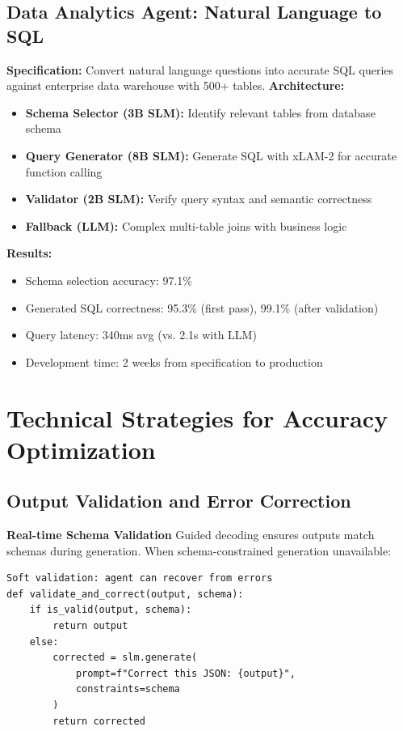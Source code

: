 \documentclass[11pt,a4paper]{article}
\begin{document}
\subsection{Data Analytics Agent: Natural Language to SQL}
\textbf{Specification:} Convert natural language questions into accurate SQL queries against enterprise data warehouse with 500+ tables.
\textbf{Architecture:}
\begin{itemize}
    \item \textbf{Schema Selector (3B SLM):} Identify relevant tables from database schema
    \item \textbf{Query Generator (8B SLM):} Generate SQL with xLAM-2 for accurate function calling
    \item \textbf{Validator (2B SLM):} Verify query syntax and semantic correctness
    \item \textbf{Fallback (LLM):} Complex multi-table joins with business logic
\end{itemize}
\textbf{Results:}
\begin{itemize}
    \item Schema selection accuracy: 97.1\%
    \item Generated SQL correctness: 95.3\% (first pass), 99.1\% (after validation)
    \item Query latency: 340ms avg (vs. 2.1s with LLM)
    \item Development time: 2 weeks from specification to production \cite{tableau2025}
\end{itemize}

\section{Technical Strategies for Accuracy Optimization}

\subsection{Output Validation and Error Correction}
\textbf{Real-time Schema Validation} \cite{nvidia2025}
Guided decoding ensures outputs match schemas during generation. When schema-constrained generation unavailable:
\begin{lstlisting}
Soft validation: agent can recover from errors
def validate_and_correct(output, schema):
    if is_valid(output, schema):
        return output
    else:
        corrected = slm.generate(
            prompt=f"Correct this JSON: {output}",
            constraints=schema
        )
        return corrected
\end{lstlisting}
\end{document}
